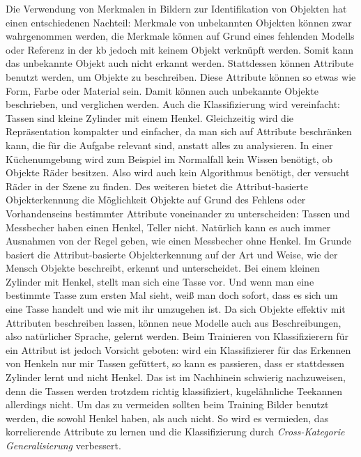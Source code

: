 Die Verwendung von Merkmalen in Bildern zur Identifikation von Objekten hat einen entschiedenen Nachteil: Merkmale von unbekannten Objekten können zwar wahrgenommen werden, die Merkmale können auf Grund eines fehlenden Modells oder Referenz in der \gls{kb} jedoch mit keinem Objekt verknüpft werden. Somit kann das unbekannte Objekt auch nicht erkannt werden. \newline
Stattdessen können Attribute benutzt werden, um Objekte zu beschreiben. Diese Attribute können so etwas wie Form, Farbe oder Material sein. Damit können auch unbekannte Objekte beschrieben, und verglichen werden. Auch die Klassifizierung wird vereinfacht: Tassen sind kleine Zylinder mit einem Henkel. Gleichzeitig wird die Repräsentation kompakter und einfacher, da man sich auf Attribute beschränken kann, die für die Aufgabe relevant sind, anstatt alles zu analysieren. In einer Küchenumgebung wird zum Beispiel im Normalfall kein Wissen benötigt, ob Objekte Räder besitzen. Also wird auch kein Algorithmus benötigt, der versucht Räder in der Szene zu finden. Des weiteren bietet die Attribut-basierte Objekterkennung die Möglichkeit Objekte auf Grund des Fehlens oder Vorhandenseins bestimmter Attribute voneinander zu unterscheiden: Tassen und Messbecher haben einen Henkel, Teller nicht. Natürlich kann es auch immer Ausnahmen von der Regel geben, wie einen Messbecher ohne Henkel. \newline
Im Grunde basiert die Attribut-basierte Objekterkennung auf der Art und Weise, wie der Mensch Objekte beschreibt, erkennt und unterscheidet. Bei einem kleinen Zylinder mit Henkel, stellt man sich eine Tasse vor. Und wenn man eine bestimmte Tasse zum ersten Mal sieht, weiß man doch sofort, dass es sich um eine Tasse handelt und wie mit ihr umzugehen ist. Da sich Objekte effektiv mit Attributen beschreiben lassen, können neue Modelle auch aus Beschreibungen, also natürlicher Sprache, gelernt werden. \newline
Beim Trainieren von Klassifizierern für ein Attribut ist jedoch Vorsicht geboten: wird ein Klassifizierer für das Erkennen von Henkeln nur mir Tassen gefüttert, so kann es passieren, dass er stattdessen Zylinder lernt und nicht Henkel. Das ist im Nachhinein schwierig nachzuweisen, denn die Tassen werden trotzdem richtig klassifiziert, kugelähnliche Teekannen allerdings nicht. Um das zu vermeiden sollten beim Training Bilder benutzt werden, die sowohl Henkel haben, als auch nicht. So wird es vermieden, das korrelierende Attribute zu lernen und die Klassifizierung durch \textit{Cross-Kategorie Generalisierung} verbessert. \cite{descObjbyAtr} \par

